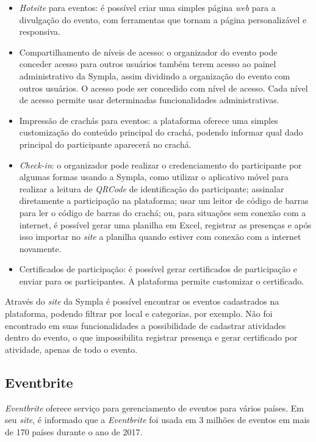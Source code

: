 \begin{itemize}
    \item \textit{Hotsite} para eventos: é possível criar uma simples página \textit{web} para a divulgação do evento, com ferramentas que tornam a página personalizável e responsiva.
    \item Compartilhamento de níveis de acesso: o organizador do evento pode conceder acesso para outros usuários também terem acesso ao painel administrativo da Sympla, assim dividindo a organização do evento com outros usuários. O acesso pode ser concedido com nível de acesso. Cada nível de acesso permite usar determinadas funcionalidades administrativas.
    \item Impressão de crachás para eventos: a plataforma oferece uma simples customização do conteúdo principal do crachá, podendo informar qual dado principal do participante aparecerá no crachá.
    \item \textit{Check-in}: o organizador pode realizar o credenciamento do participante por algumas formas usando a Sympla, como utilizar o aplicativo móvel para realizar a leitura de \textit{QRCode} de identificação do participante; assinalar diretamente a participação na plataforma; usar um leitor de código de barras para ler o código de barras do crachá; ou, para situações sem conexão com a internet, é possível gerar uma planilha em Excel, registrar as presenças e após isso importar no \textit{site} a planilha quando estiver com conexão com a internet novamente.
    \item Certificados de participação: é possível gerar certificados de participação e enviar para os participantes. A plataforma permite customizar o certificado.
\end{itemize}

Através do \textit{site} da Sympla é possível encontrar os eventos cadastrados na plataforma, podendo filtrar por local e categorias, por exemplo. Não foi encontrado em suas funcionalidades a possibilidade de cadastrar atividades dentro do evento, o que impossibilita registrar presença e gerar certificado por atividade, apenas de todo o evento.

\subsection{Eventbrite}

\textit{Eventbrite} oferece serviço para gerenciamento de eventos para vários países. Em seu \textit{site}, é informado que a \textit{Eventbrite} foi usada em 3 milhões de eventos em mais de 170 países durante o ano de 2017.

